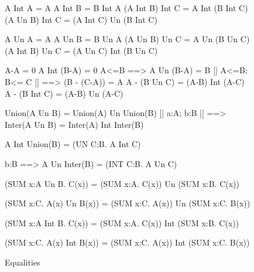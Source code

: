 \begin{figure}
\begin{ttbox}
         A Int A = A
        A Int B = B Int A
          (A Int B) Int C  =  A Int (B Int C)
     (A Un B) Int C  =  (A Int C) Un (B Int C)

          A Un A = A
         A Un B = B Un A
           (A Un B) Un C  =  A Un (B Un C)
     (A Int B) Un C  =  (A Un C) Int (B Un C)

        A-A = 0
      A Int (B-A) = 0
     A<=B ==> A Un (B-A) = B
  [| A<=B; B<= C |] ==> (B - (C-A)) = A
            A - (B Un C) = (A-B) Int (A-C)
           A - (B Int C) = (A-B) Un (A-C)

   Union(A Un B) = Union(A) Un Union(B)
   [| a:A;  b:B |] ==> 
                   Inter(A Un B) = Inter(A) Int Inter(B)

   A Int Union(B) = (UN C:B. A Int C)

    b:B ==> 
                   A Un Inter(B) = (INT C:B. A Un C)

    (SUM x:A Un B. C(x)) = 
                   (SUM x:A. C(x)) Un (SUM x:B. C(x))

    (SUM x:C. A(x) Un B(x)) =
                   (SUM x:C. A(x))  Un  (SUM x:C. B(x))

   (SUM x:A Int B. C(x)) =
                   (SUM x:A. C(x)) Int (SUM x:B. C(x))

   (SUM x:C. A(x) Int B(x)) =
                   (SUM x:C. A(x)) Int (SUM x:C. B(x))
\end{ttbox}
\caption{Equalities} \label{zf-equalities}
\end{figure}



